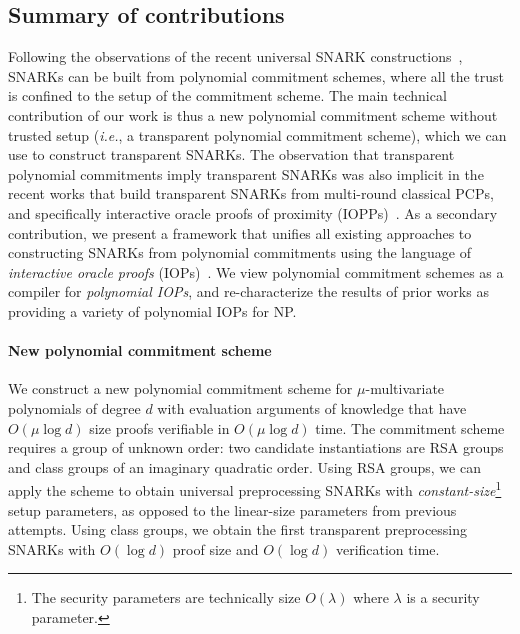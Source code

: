 \subsection{Summary of contributions} 
Following the observations of the recent universal SNARK constructions~\cite{Plonk,Sonic,Libra}, SNARKs can be built from polynomial commitment schemes, where all the trust is confined to the setup of the commitment scheme. The main technical contribution of our work is thus a new polynomial commitment scheme without trusted setup (\emph{i.e.}, a transparent polynomial commitment scheme), which we can use to construct transparent SNARKs. The observation that transparent polynomial commitments imply transparent SNARKs was also implicit in the recent works that build transparent SNARKs from multi-round classical PCPs, and specifically interactive oracle proofs of proximity (IOPPs)~\cite{ICALP:BBHR18}. As a secondary contribution, we present a framework that unifies all existing approaches to constructing SNARKs from polynomial commitments using the language of \emph{interactive oracle proofs} (IOPs)~\cite{STOC:ReiRotRot16,TCC:BenChiSpo16}. We view polynomial commitment schemes as a compiler for \emph{polynomial IOPs}, and re-characterize the results of prior works as providing a variety of polynomial IOPs for NP. 

\paragraph{New polynomial commitment scheme} We construct a new polynomial commitment scheme for $\mu$-multivariate polynomials of degree $d$ with evaluation arguments of knowledge that have $O(\mu \log d)$ size proofs verifiable in $O(\mu \log d)$ time. The commitment scheme requires a group of unknown order: two candidate instantiations are RSA groups and class groups of an imaginary quadratic order. Using RSA groups, we can apply the scheme to obtain universal preprocessing SNARKs with \emph{constant-size}\footnote{The security parameters are technically size $O(\lambda)$ where $\lambda$ is a security parameter.} setup parameters, as opposed to the linear-size parameters from previous attempts. Using class groups, we obtain the first transparent preprocessing SNARKs with $O(\log d)$ proof size and $O(\log d)$ verification time. %

